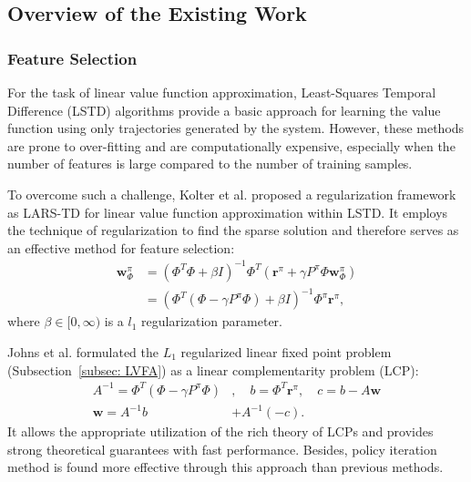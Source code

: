 \documentclass[onecolumn, conference]{IEEEtran}
\begin{document}
\subsection{Overview of the Existing Work}\label{subsec:overview}
\subsubsection{Feature Selection}\label{} For the task of linear value function approximation, Least-Squares Temporal Difference (LSTD) algorithms \cite{Bradtke2004LinearLA, Sutton2005LearningTP, Geramifard2006IncrementalLT} provide a basic approach for learning the value function using only trajectories generated by the system. However, these methods are prone to over-fitting and are computationally expensive, especially when the number of features is large compared to the number of training samples. 

To overcome such a challenge, Kolter et al.\cite{Kolter2009RegularizationAF} proposed a regularization framework as LARS-TD for linear value function approximation within LSTD. It employs the technique of regularization to find the sparse solution and therefore serves as an effective method for feature selection:
\begin{align*}
    \boldsymbol{w}_\Phi^\pi &= (\Phi^T\Phi + \beta I)^{-1}\Phi^T(\boldsymbol{r}^\pi + \gamma P^\pi\Phi \boldsymbol{w}_\Phi^\pi)\\
    &=\left(\Phi^T(\Phi - \gamma P^\pi\Phi)+\beta I \right)^{-1} \Phi^\pi \boldsymbol{r}^\pi,
\end{align*}
where $\beta \in [0,\infty)$ is a $l_1$ regularization parameter. 

Johns et al.\cite{Johns2010LinearCF} formulated the $L_1$ regularized linear fixed point problem (Subsection~\ref{subsec: LVFA}) as a linear complementarity problem (LCP):
\begin{align*}
    A^{-1} = \Phi^T(\Phi-\gamma P^\pi\Phi)&,\quad b = \Phi^T\boldsymbol{r}^\pi,\quad c = b-A\boldsymbol{w}\\
    \boldsymbol{w} = A^{-1}b &+ A^{-1}(-c).
\end{align*}
It allows the appropriate utilization of the rich theory of LCPs and provides strong theoretical guarantees with fast performance. Besides, policy iteration method is found more effective through this approach than previous methods.
\end{document}
